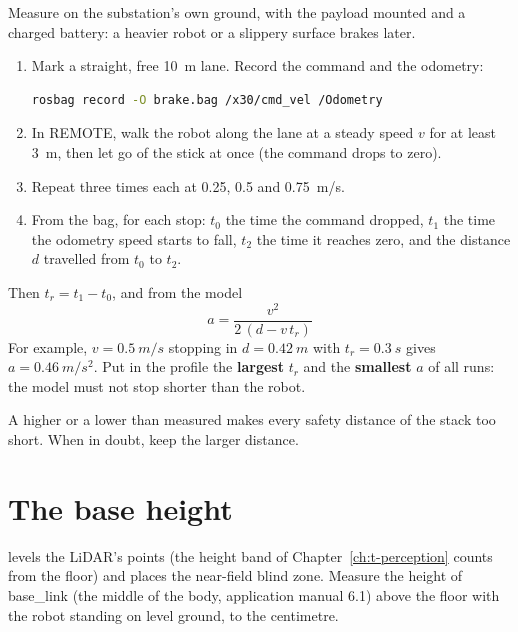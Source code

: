Measure on the substation's own ground, with the payload mounted and a charged battery: a heavier
robot or a slippery surface brakes later.

\begin{enumerate}
  \item Mark a straight, free \SI{10}{m} lane. Record the command and the odometry:
\begin{lstlisting}[language=bash]
rosbag record -O brake.bag /x30/cmd_vel /Odometry
\end{lstlisting}
  \item In REMOTE, walk the robot along the lane at a steady speed $v$ for at least \SI{3}{m},
    then let go of the stick at once (the command drops to zero).
  \item Repeat three times each at \num{0.25}, \num{0.5} and \SI{0.75}{m/s}.
  \item From the bag, for each stop: $t_0$ the time the command dropped, $t_1$ the time the
    odometry speed starts to fall, $t_2$ the time it reaches zero, and the distance $d$ travelled
    from $t_0$ to $t_2$.
\end{enumerate}

Then $t_r = t_1 - t_0$, and from the model
\begin{equation}
  a = \frac{v^2}{2\,(d - v\,t_r)}
  \label{eq:t-decel}
\end{equation}
For example, $v = \SI{0.5}{m/s}$ stopping in $d = \SI{0.42}{m}$ with $t_r = \SI{0.3}{s}$ gives
$a = \SI{0.46}{m/s^2}$. Put in the profile the \textbf{largest} $t_r$ and the \textbf{smallest} $a$
of all runs: the model must not stop shorter than the robot.

\begin{dangerbox}
A higher  or a lower  than measured makes every safety
distance of the stack too short. When in doubt, keep the larger distance.
\end{dangerbox}

\section{The base height}

 levels the LiDAR's points (the height band of Chapter~\ref{ch:t-perception}
counts from the floor) and places the near-field blind zone. Measure the height of base\_link
(the middle of the body, application manual 6.1) above the floor with the robot standing on
level ground, to the centimetre.
